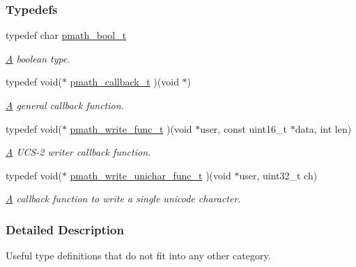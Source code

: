 \subsubsection*{Typedefs}
\begin{CompactItemize}
\item 
typedef char \hyperlink{group__general__types_gc92090cb0b56345d6c379ed2341d4ef4}{pmath\_\-bool\_\-t}
\begin{CompactList}\small\item\em \hyperlink{class_a}{A} boolean type. \item\end{CompactList}\item 
typedef void($\ast$ \hyperlink{group__general__types_ge1a454657f18f3cc54508adeccccbcbc}{pmath\_\-callback\_\-t} )(void $\ast$)
\begin{CompactList}\small\item\em \hyperlink{class_a}{A} general callback function. \item\end{CompactList}\item 
typedef void($\ast$ \hyperlink{group__general__types_g781a2e0445795bb4e091470fb20497cc}{pmath\_\-write\_\-func\_\-t} )(void $\ast$user, const uint16\_\-t $\ast$data, int len)
\begin{CompactList}\small\item\em \hyperlink{class_a}{A} UCS-2 writer callback function. \item\end{CompactList}\item 
\hypertarget{group__general__types_ga04eea54f504dabf2289cf9f62cb6100}{
typedef void($\ast$ \hyperlink{group__general__types_ga04eea54f504dabf2289cf9f62cb6100}{pmath\_\-write\_\-unichar\_\-func\_\-t} )(void $\ast$user, uint32\_\-t ch)}
\label{group__general__types_ga04eea54f504dabf2289cf9f62cb6100}

\begin{CompactList}\small\item\em \hyperlink{class_a}{A} callback function to write a single unicode character. \item\end{CompactList}\end{CompactItemize}


\subsubsection{Detailed Description}
Useful type definitions that do not fit into any other category. 

